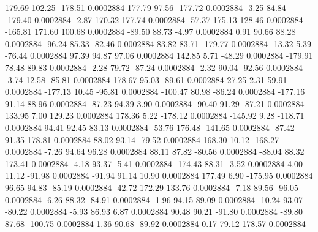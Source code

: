       179.69      102.25     -178.51     0.0002884
      177.79       97.56     -177.72     0.0002884
       -3.25       84.84     -179.40     0.0002884
       -2.87      170.32      177.74     0.0002884
      -57.37      175.13      128.46     0.0002884
     -165.81      171.60      100.68     0.0002884
      -89.50       88.73       -4.97     0.0002884
        0.91       90.66       88.28     0.0002884
      -96.24       85.33      -82.46     0.0002884
       83.82       83.71     -179.77     0.0002884
      -13.32        5.39      -76.44     0.0002884
       97.39       94.87       97.06     0.0002884
      142.85        5.71      -48.29     0.0002884
     -179.91       78.48       89.83     0.0002884
       -2.28       79.72      -87.24     0.0002884
       -2.32       90.04      -92.56     0.0002884
       -3.74       12.58      -85.81     0.0002884
      178.67       95.03      -89.61     0.0002884
       27.25        2.31       59.91     0.0002884
     -177.13       10.45      -95.81     0.0002884
     -100.47       80.98      -86.24     0.0002884
     -177.16       91.14       88.96     0.0002884
      -87.23       94.39        3.90     0.0002884
      -90.40       91.29      -87.21     0.0002884
      133.95        7.00      129.23     0.0002884
      178.36        5.22     -178.12     0.0002884
     -145.92        9.28     -118.71     0.0002884
       94.41       92.45       83.13     0.0002884
      -53.76      176.48     -141.65     0.0002884
      -87.42       91.35      178.81     0.0002884
       88.02       93.14      -79.52     0.0002884
      168.30       10.12     -168.27     0.0002884
       -7.26       94.64       96.28     0.0002884
       88.11       87.82      -80.56     0.0002884
      -88.04       88.32      173.41     0.0002884
       -4.18       93.37       -5.41     0.0002884
     -174.43       88.31       -3.52     0.0002884
        4.00       11.12      -91.98     0.0002884
      -91.94       91.14       10.90     0.0002884
      177.49        6.90     -175.95     0.0002884
       96.65       94.83      -85.19     0.0002884
      -42.72      172.29      133.76     0.0002884
       -7.18       89.56      -96.05     0.0002884
       -6.26       88.32      -84.91     0.0002884
       -1.96       94.15       89.09     0.0002884
      -10.24       93.07      -80.22     0.0002884
       -5.93       86.93        6.87     0.0002884
       90.48       90.21      -91.80     0.0002884
      -89.80       87.68     -100.75     0.0002884
        1.36       90.68      -89.92     0.0002884
        0.17       79.12      178.57     0.0002884
